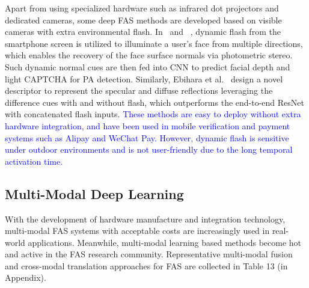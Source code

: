 \documentclass[10pt,journal,compsoc]{IEEEtran}
\begin{document}
Apart from using specialized hardware such as infrared dot projectors and dedicated cameras, some deep FAS methods are developed based on visible cameras with extra environmental flash. In~\cite{liu2019AuroraGuard} and ~\cite{farrukh2020facerevelio}, dynamic flash from the smartphone screen is utilized to illuminate a user’s face from multiple directions, which enables the recovery of the face surface normals via photometric stereo. Such dynamic normal cues are then fed into CNN to predict facial depth and light CAPTCHA for PA detection. Similarly, Ebihara et al.~\cite{ebihara2019specular} design a novel descriptor to represent the specular and diffuse reflections leveraging the difference cues with and without flash, which outperforms the end-to-end ResNet with concatenated flash inputs. \textcolor{blue}{These methods are easy to deploy without extra hardware integration, and have been used in mobile verification and payment systems such as Alipay and WeChat Pay. However, dynamic flash is sensitive under outdoor environments and is not user-friendly due to the long temporal activation time.} 



\subsection{Multi-Modal Deep Learning}
With the development of hardware manufacture and integration technology, multi-modal FAS systems with acceptable costs are increasingly used in real-world applications. Meanwhile, multi-modal learning based methods become hot and active in the FAS research community. Representative multi-modal fusion and cross-modal translation approaches for FAS are collected in Table 13 (in Appendix).

\vspace{0.4em}
\end{document}
